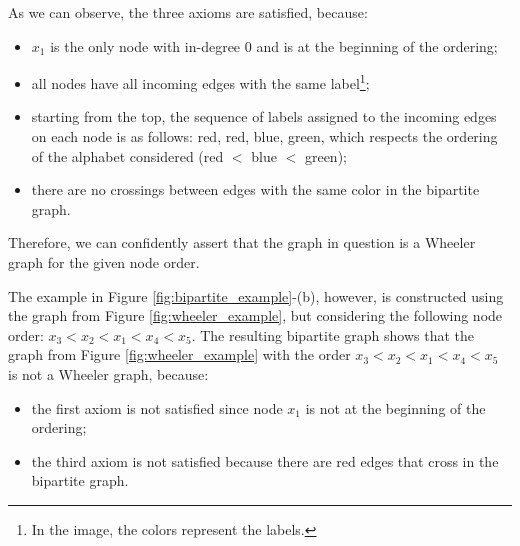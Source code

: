 As we can observe, the three axioms are satisfied, because:
\begin{itemize}
    \item $x_1$ is the only node with in-degree $0$ and is at the beginning of the ordering;
    \item all nodes have all incoming edges with the same label\footnote{In the image, the colors represent the labels.};
    \item starting from the top, the sequence of labels assigned to the incoming edges on each node is as follows: red, red, blue, green, which respects the ordering of the alphabet considered (red $<$ blue $<$ green);
    \item there are no crossings between edges with the same color in the bipartite graph.
\end{itemize}
Therefore, we can confidently assert that the graph in question is a Wheeler graph for the given node order.

The example in Figure \ref{fig:bipartite_example}-(b), however, is constructed using the graph from Figure \ref{fig:wheeler_example}, but considering the following node order: $x_3<x_2<x_1<x_4<x_5$. The resulting bipartite graph shows that the graph from Figure \ref{fig:wheeler_example} with the order $x_3<x_2<x_1<x_4<x_5$ is not a Wheeler graph, because:
\begin{itemize}
    \item the first axiom is not satisfied since node $x_1$ is not at the beginning of the ordering;
    \item the third axiom is not satisfied because there are red edges that cross in the bipartite graph.
\end{itemize}